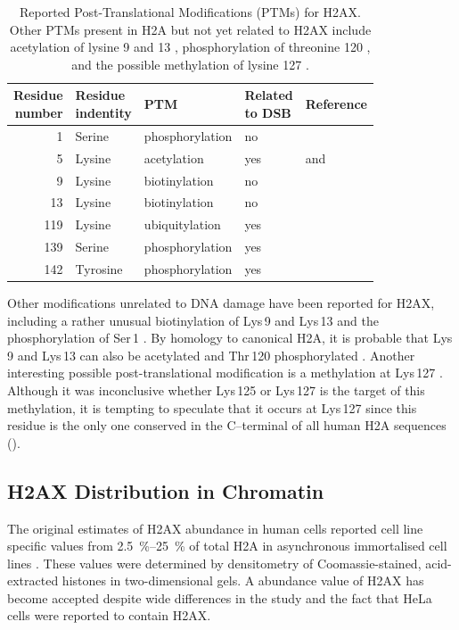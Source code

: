 \begin{table}
\centering
\caption{Reported Post-Translational Modifications (PTMs) for H2AX\@. Other PTMs present in H2A but
not yet related to H2AX include acetylation of lysine 9 and 13 \protect\citep{ZEP+03}, phosphorylation
of threonine 120 \protect\citep{ANY+04}, and the possible methylation of lysine 127 \protect\citep{ZEP+03}.}
\label{tab:h2ax-review:H2AX-PTM}
\begin{tabularx}{\linewidth}{r l l l >{\raggedright\arraybackslash}X}
\toprule
\makecell{Residue\\number} & \makecell{Residue\\indentity} & PTM & \makecell{Related\\to DSB} & Reference  \\
\midrule
1   & Serine & phosphorylation & no  & \citet{PB81} \\
5   & Lysine    & acetylation     & yes & \citet{PB81} and \citet{ITK+07} \\
9   & Lysine    & biotinylation   & no  & \citet{CCK+06} \\
13  & Lysine   & biotinylation   & no  & \citet{CCK+06} \\
119 & Lysine  & ubiquitylation  & yes & \citet{ITK+07} \\
139 & Serine  & phosphorylation & yes & \citet{EPR+98} \\
142 & Tyrosine  & phosphorylation & yes & \citet{XLS+09} \\
\bottomrule
\end{tabularx}
\end{table}

Other modifications unrelated to DNA damage have been reported for H2AX, including a rather unusual
biotinylation of Lys\,9 and Lys\,13 \citep{CCK+06} and the phosphorylation of Ser\,1 \citep{PB81}. By
homology to canonical H2A, it is probable that Lys\,9 and Lys\,13 can also be acetylated \citep{ZEP+03}
and Thr\,120 phosphorylated \citep{ANY+04}. Another interesting possible post-translational modification
is a methylation at Lys\,127 \citep{ZEP+03}. Although it was inconclusive whether Lys\,125 or Lys\,127
is the target of this methylation, it is tempting to speculate that it occurs at Lys\,127 since this
residue is the only one conserved in the C--terminal of all human H2A sequences ().

\subsection{H2AX Distribution in Chromatin}
\label{subsec:h2ax-review:H2AX-distribution}
The original estimates of H2AX abundance in human cells reported cell line specific values from
\SIrange{2.5}{25}{\percent} of total H2A in asynchronous immortalised cell lines \citep{EPR+98}. These values were
determined by densitometry of Coomassie-stained, acid-extracted histones in two-dimensional gels. A
 abundance value of H2AX has become accepted despite wide differences in the study and the fact
that HeLa cells were reported to contain  H2AX\@.

